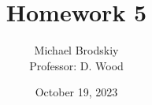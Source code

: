 


\title{Homework 5}
\date{October 19, 2023}
\author{Michael Brodskiy\\ \small Professor: D. Wood}



\maketitle

